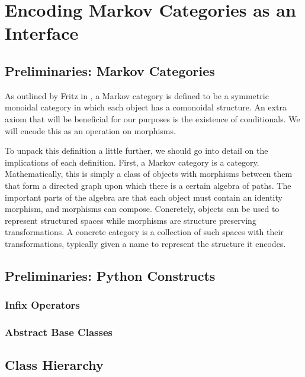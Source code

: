 \section{Encoding Markov Categories as an Interface}
\subsection{Preliminaries: Markov Categories}
As outlined by Fritz in \cite{fritz}, a Markov category is defined to be a symmetric monoidal category in which each object has a comonoidal structure.
An extra axiom that will be beneficial for our purposes is the existence of conditionals.
We will encode this as an operation on morphisms.

To unpack this definition a little further, we should go into detail on the implications of each definition.
First, a Markov category is a category.
Mathematically, this is simply a class of objects with morphisms between them that form a directed graph upon which there is a certain algebra of paths.
The important parts of the algebra are that each object must contain an identity morphism, and morphisms can compose.
Concretely, objects can be used to represent structured spaces while morphisms are structure preserving transformations.
A concrete category is a collection of such spaces with their transformations, typically given a name to represent the structure it encodes.

\subsection{Preliminaries: Python Constructs}
\subsubsection{Infix Operators}
\subsubsection{Abstract Base Classes}

\subsection{Class Hierarchy}
